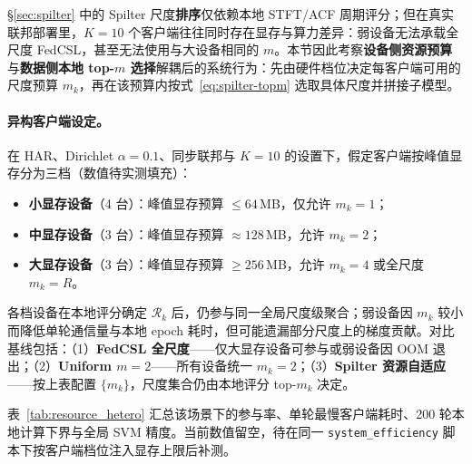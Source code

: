 \documentclass{article}
\begin{document}
§\ref{sec:spilter} 中的 Spilter 尺度\textbf{排序}仅依赖本地 STFT/ACF 周期评分；但在真实联邦部署里，$K=10$ 个客户端往往同时存在显存与算力差异：弱设备无法承载全尺度 FedCSL，甚至无法使用与大设备相同的 $m$。本节因此考察\textbf{设备侧资源预算}与\textbf{数据侧本地 top-$m$ 选择}解耦后的系统行为：先由硬件档位决定每客户端可用的尺度预算 $m_k$，再在该预算内按式~\eqref{eq:spilter-topm} 选取具体尺度并拼接子模型。

\paragraph{异构客户端设定。}
在 HAR、Dirichlet $\alpha=0.1$、同步联邦与 $K=10$ 的设置下，假定客户端按峰值显存分为三档（数值待实测填充）：
\begin{itemize}[leftmargin=2em]
    \item \textbf{小显存设备}（4 台）：峰值显存预算 $\leq 64$\,MB，仅允许 $m_k=1$；
    \item \textbf{中显存设备}（3 台）：峰值显存预算 $\approx 128$\,MB，允许 $m_k=2$；
    \item \textbf{大显存设备}（3 台）：峰值显存预算 $\geq 256$\,MB，允许 $m_k=4$ 或全尺度 $m_k=R$。
\end{itemize}
各档设备在本地评分确定 $\mathcal{R}_k$ 后，仍参与同一全局尺度级聚合；弱设备因 $m_k$ 较小而降低单轮通信量与本地 epoch 耗时，但可能遗漏部分尺度上的梯度贡献。对比基线包括：（1）\textbf{FedCSL 全尺度}——仅大显存设备可参与或弱设备因 OOM 退出；（2）\textbf{Uniform $m{=}2$}——所有设备统一 $m_k=2$；（3）\textbf{Spilter 资源自适应}——按上表配置 $\{m_k\}$，尺度集合仍由本地评分 top-$m_k$ 决定。

表~\ref{tab:resource_hetero} 汇总该场景下的参与率、单轮最慢客户端耗时、200 轮本地计算下界与全局 SVM 精度。当前数值留空，待在同一 \texttt{system\_efficiency} 脚本下按客户端档位注入显存上限后补测。

\begin{table}[htbp]
  \centering
  \caption{系统资源不平衡场景下的联邦训练效果（HAR，Dirichlet $\alpha=0.1$，$K=10$；小/中/大显存设备分别为 4/3/3 台）。Participation 为可完成本地 epoch 的客户端比例；Slowest Epoch 为同步轮次最慢客户端耗时；Final Acc.\ 为全局表示 + SVM 测试精度。数值待补。}
  \label{tab:resource_hetero}
\end{table}
\end{document}

